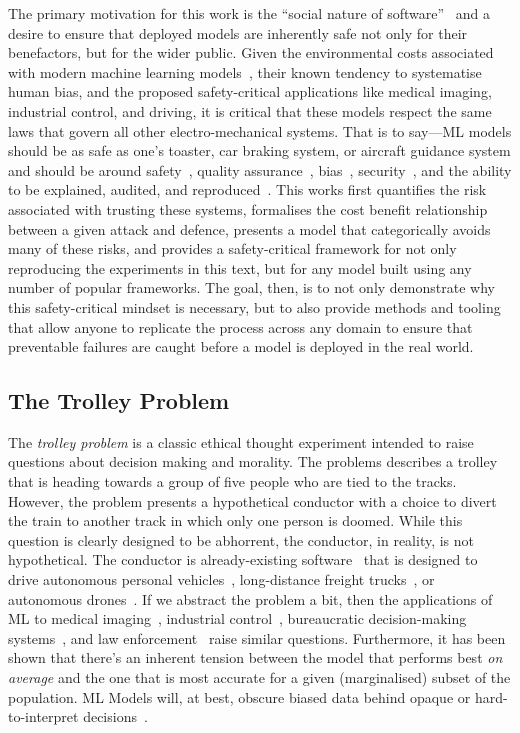 The primary motivation for this work is the ``social nature of software''~\cite{social_code} and a desire to ensure that deployed models are inherently safe not only for their benefactors, but for the wider public. 
Given the environmental costs associated with modern machine learning models~\cite{ai_power}, their known tendency to systematise human bias, and the proposed safety-critical applications like medical imaging, industrial control, and driving, it is critical that these models respect the same laws that govern all other electro-mechanical systems. 
That is to say---ML models should be as safe as one's toaster, car braking system, or aircraft guidance system and should be around safety~\cite{iso26262}, quality assurance~\cite{IEC62034}, bias~\cite{ai_eu_act}, security~\cite{iso2700,nist_antivirus}, and the ability to be explained, audited, and reproduced~\cite{IEC62034,IEC61508,iso26262,hipaa,coppa}. 
This works first quantifies the risk associated with trusting these systems, formalises the cost benefit relationship between a given attack and defence, presents a model that categorically avoids many of these risks, and provides a safety-critical framework for not only reproducing the experiments in this text, but for any model built using any number of popular frameworks. 
The goal, then, is to not only demonstrate why this safety-critical mindset is necessary, but to also provide methods and tooling that allow anyone to replicate the process across any domain to ensure that preventable failures are caught before a model is deployed in the real world. 


\subsection{The Trolley Problem}

The \textit{trolley problem} is a classic ethical thought experiment intended to raise questions about decision making and morality. 
The problems describes a trolley that is heading towards a group of five people who are tied to the tracks. 
However, the problem presents a hypothetical conductor with a choice to divert the train to another track in which only one person is doomed. 
While this question is clearly designed to be abhorrent, the conductor, in reality, is not hypothetical. 
The conductor is already-existing software~\cite{teslasleep1,teslasleep2,teslasleep3} that is designed to drive autonomous personal vehicles~\cite{ai_automotive}, long-distance freight trucks~\cite{ai_trucking}, or autonomous drones~\cite{ai_drones}. 
If we abstract the problem a bit, then the applications of ML to medical imaging~\cite{ai_medical_imaging}, industrial control~\cite{ai_industry}, bureaucratic decision-making systems~\cite{ai_prison}, and law enforcement~\cite{ai_security} raise similar questions. 
Furthermore, it has been shown that there's an inherent tension between the model that performs best \textit{on average} and the one that is most accurate for a given (marginalised) subset of the population.
ML Models will, at best, obscure biased data behind opaque or hard-to-interpret decisions~\cite{buolamwini2018gender}.

